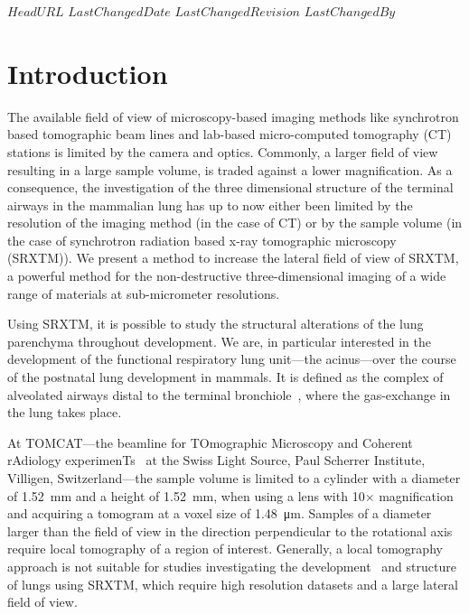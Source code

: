 \svnidlong
{$HeadURL$}
{$LastChangedDate$}
{$LastChangedRevision$}
{$LastChangedBy$}
%
%
\section{Introduction}

The available field of view of microscopy-based imaging methods like synchrotron based tomographic beam lines and lab-based micro-computed tomography (\micro CT) stations is limited by the camera and optics. Commonly, a larger field of view resulting in a large sample volume, is traded against a lower magnification. As a consequence, the investigation of the three dimensional structure of the terminal airways in the mammalian lung has up to now either been limited by the resolution of the imaging method (in the case of \micro CT) or by the sample volume (in the case of synchrotron radiation based x-ray tomographic microscopy (SRXTM)). We present a method to increase the lateral field of view of SRXTM, a powerful method for the non-destructive three-dimensional imaging of a wide range of materials at sub-micrometer resolutions.

Using SRXTM, it is possible to study the structural alterations of the lung parenchyma throughout development. We are, in particular interested in the development of the functional respiratory lung unit---the acinus---over the course of the postnatal lung development in mammals. It is defined as the complex of alveolated airways distal to the terminal bronchiole~\cite{Rodriguez1987}, where the gas-exchange in the lung takes place.

At TOMCAT---the beamline for TOmographic Microscopy and Coherent rAdiology experimenTs~\cite{Stampanoni2007} at the Swiss Light Source, Paul Scherrer Institute, Villigen, Switzerland---the sample volume is limited to a cylinder with a diameter of \SI{1.52}{\milli\meter} and a height of \SI{1.52}{\milli\meter}, when using a lens with 10$\times$ magnification and acquiring a tomogram at a voxel size of \SI{1.48}{\micro\meter}. Samples of a diameter larger than the field of view in the direction perpendicular to the rotational axis require local tomography of a region of interest. Generally, a local tomography approach is not suitable for studies investigating the development~\cite{Schittny2008,Mund2008,Haberthuer2009c} and structure~\cite{Tsuda2008} of lungs using SRXTM, which require high resolution datasets and a large lateral field of view.

